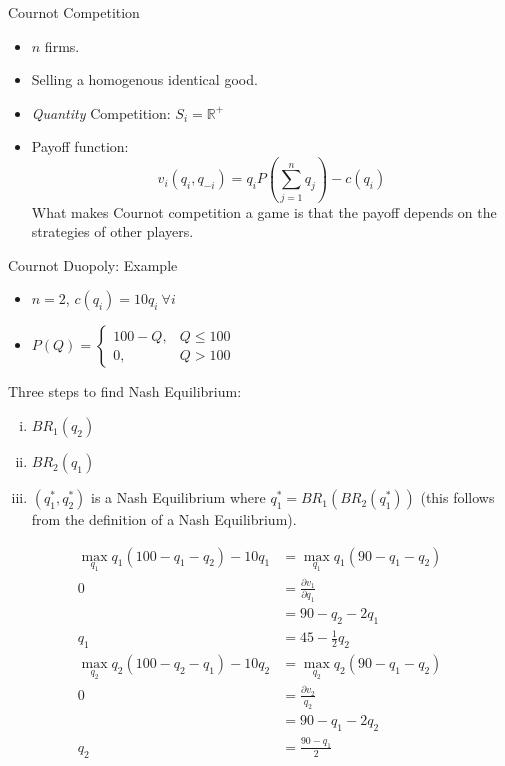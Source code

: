 \documentclass[10pt]{extarticle}
\begin{document}
  \begin{problem}{Cournot Competition}
    \begin{itemize}
      \item $n$ firms.
      \item Selling a homogenous identical good.
      \item \textit{Quantity} Competition: $S_i = \mathbb{R}^+$
      \item Payoff function:
        \[
          v_i(q_i,q_{-i}) = q_i P\left(\sum_{j = 1}^{n} q_j\right) - c(q_i)
        \] 
        What makes Cournot competition a game is that the payoff depends on the strategies of other players.
    \end{itemize}
  \end{problem}
  \begin{problem}{Cournot Duopoly: Example}
    \begin{itemize}
      \item $n=2$, $c(q_i) = 10q_i~\forall i$
      \item $P(Q) = \begin{cases}100-Q,&Q\leq 100\\0,&Q>100\end{cases}$
    \end{itemize}
    Three steps to find Nash Equilibrium:
    \begin{enumerate}[(i)]
      \item $BR_1(q_2)$
      \item $BR_2(q_1)$
      \item $(q_1^*,q_2^*)$ is a Nash Equilibrium where $q_1^* = BR_1(BR_2(q_1^*))$ (this follows from the definition of a Nash Equilibrium).
    \end{enumerate}
    \begin{align*}
      \max_{q_1} q_1(100-q_1-q_2)-10q_1 &= \max_{q_1} q_1(90-q_1-q_2)\\
      0 &= \frac{\partial v_1}{\partial q_1}\\
        &= 90-q_2-2q_1\\
      q_1 &= 45-\frac{1}{2}q_2
    \end{align*}
    \begin{align*}
      \max_{q_2} q_2(100-q_2-q_1)-10q_2 &= \max_{q_2}q_2(90-q_1-q_2)\\
      0&=\frac{\partial v_2}{q_2}\\
       &= 90-q_1-2q_2\\
      q_2 &= \frac{90-q_1}{2}
    \end{align*}
    \begin{description}

\end{description}
\end{problem}
\end{document}
